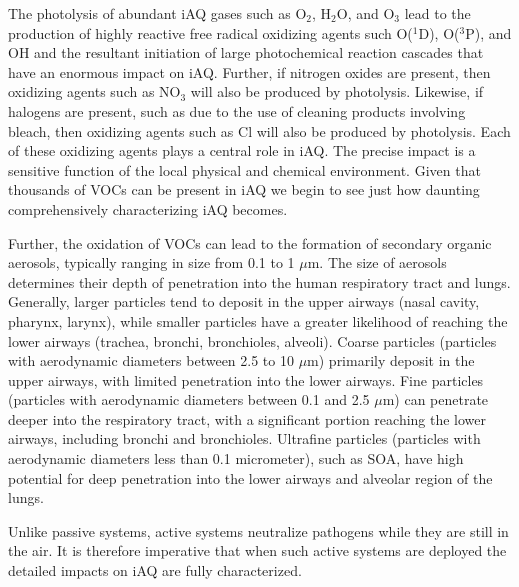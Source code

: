 \documentclass[twoside,twocolumn]{article}
\begin{document}
The photolysis of abundant iAQ gases such as O$_2$, H$_2$O, and O$_3$ lead to the production of highly reactive free radical oxidizing agents such O($^1$D), O($^3$P), and OH and the resultant initiation of large photochemical reaction cascades that have an enormous impact on iAQ. Further, if nitrogen oxides are present, then oxidizing agents such as NO$_3$ will also be produced by photolysis. Likewise, if halogens are present, such as due to the use of cleaning products involving bleach, then oxidizing agents such as Cl will also be produced by photolysis. Each of these oxidizing agents plays a central role in iAQ. The precise impact is a sensitive function of the local physical and chemical environment. Given that thousands of VOCs can be present in iAQ we begin to see just how daunting comprehensively characterizing iAQ becomes.  

Further, the oxidation of VOCs can lead to the formation of secondary organic aerosols, typically ranging in size from 0.1 to 1 $\mu$m. The size of aerosols determines their depth of penetration into the human respiratory tract and lungs. Generally, larger particles tend to deposit in the upper airways (nasal cavity, pharynx, larynx), while smaller particles have a greater likelihood of reaching the lower airways (trachea, bronchi, bronchioles, alveoli). Coarse particles (particles with aerodynamic diameters between 2.5 to 10 $\mu$m) primarily deposit in the upper airways, with limited penetration into the lower airways. Fine particles (particles with aerodynamic diameters between 0.1 and 2.5 $\mu$m) can penetrate deeper into the respiratory tract, with a significant portion reaching the lower airways, including bronchi and bronchioles. Ultrafine particles (particles with aerodynamic diameters less than 0.1 micrometer), such as SOA, have high potential for deep penetration into the lower airways and alveolar region of the lungs.




Unlike passive systems, active systems neutralize pathogens while they are still in the air. It is therefore imperative that when such active systems are deployed the detailed impacts on iAQ are fully characterized. 




\end{document}
